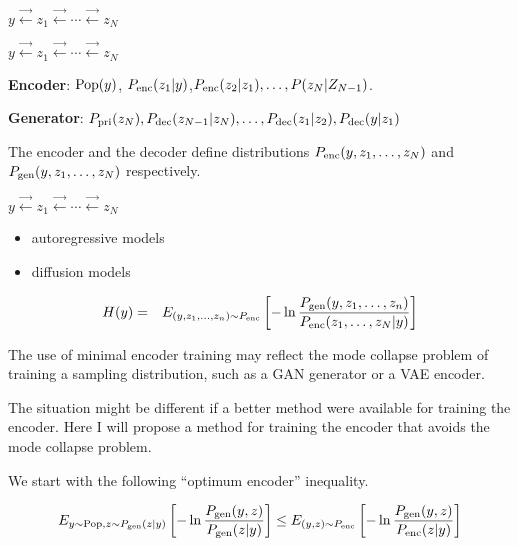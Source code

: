 {\vfill
\centerline{$y \stackrel{\rightarrow}{\leftarrow} z_1  \stackrel{\rightarrow}{\leftarrow} \cdots \stackrel{\rightarrow}{\leftarrow} z_N$}

\centerline{$y \stackrel{\rightarrow}{\leftarrow} z_1  \stackrel{\rightarrow}{\leftarrow} \cdots \stackrel{\rightarrow}{\leftarrow} z_N$}

\vfill
{\bf Encoder}: $\mathrm{Pop}(y)$, $P_{\mathrm{enc}}(z_1|y)$,$P_{\mathrm{enc}}(z_2|z_1),\ldots,P(z_N|Z_{N-1})$.


\vfill
{\bf Generator}: $P_{\mathrm{pri}}(z_N),P_{\mathrm{dec}}(z_{N-1}|z_N),\ldots,P_{\mathrm{dec}}(z_1|z_2),P_{\mathrm{dec}}(y|z_1)$

\vfill
The encoder and the decoder define distributions
$P_{\mathrm{enc}}(y,z_1,\ldots,z_N)$ and $P_{\mathrm{gen}}(y,z_1,\ldots,z_N)$ respectively.



\centerline{$y \stackrel{\rightarrow}{\leftarrow} z_1  \stackrel{\rightarrow}{\leftarrow} \cdots \stackrel{\rightarrow}{\leftarrow} z_N$}

\vfill
\begin{itemize}
\item autoregressive models

\vfill
\item diffusion models
\end{itemize}


\begin{eqnarray*}
H(y) & = & E_{(y,z_1,\ldots,z_n) \sim
P_{\mathrm{enc}}}\left[- \ln\frac{P_{\mathrm{gen}}(y,z_1,\ldots,z_n)}{P_{\mathrm{enc}}(z_1,\ldots,z_N|y)}\right]\\
\end{eqnarray*}


The use of minimal encoder training may reflect the mode collapse problem of training a sampling distribution, such as a GAN generator or a VAE encoder.

\vfill
The situation might be different if a better method were available for training the encoder.
Here I will propose a method for training the encoder that avoids the mode collapse problem.

We start with the following ``optimum encoder'' inequality.

\vfill
{\color{red}
$$E_{y \sim \mathrm{Pop},z \sim P_{\mathrm{gen}}(z|y)}\left[ - \ln \frac{P_{\mathrm{gen}}(y,z)}{P_{\mathrm{gen}}(z|y)}\right] \leq E_{(y,z) \sim P_{\mathrm{enc}}}\left[ - \ln \frac{P_{\mathrm{gen}}(y,z)}{P_{\mathrm{enc}}(z|y)}\right]$$
}

}
